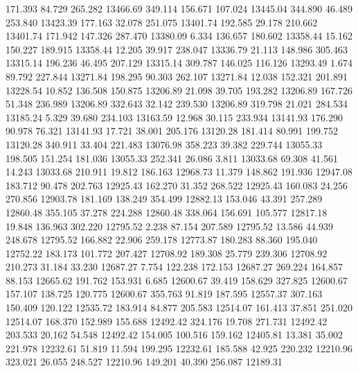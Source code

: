  171.393   84.729  265.282     13466.69
 349.114  156.671  107.024     13445.04
 344.890   46.489  253.840     13423.39
 177.163   32.078  251.075     13401.74
 192.585   29.178  210.662     13401.74
 171.942  147.326  287.470     13380.09
   6.334  136.657  180.602     13358.44
  15.162  150.227  189.915     13358.44
  12.205   39.917  238.047     13336.79
  21.113  148.986  305.463     13315.14
 196.236   46.495  207.129     13315.14
 309.787  146.025  116.126     13293.49
   1.674   89.792  227.844     13271.84
 198.295   90.303  262.107     13271.84
  12.038  152.321  201.891     13228.54
  10.852  136.508  150.875     13206.89
  21.098   39.705  193.282     13206.89
 167.726   51.348  236.989     13206.89
 332.643   32.142  239.530     13206.89
 319.798   21.021  284.534     13185.24
   5.329   39.680  234.103     13163.59
  12.968   30.115  233.934     13141.93
 176.290   90.978   76.321     13141.93
  17.721   38.001  205.176     13120.28
 181.414   80.991  199.752     13120.28
 340.911   33.404  221.483     13076.98
 358.223   39.382  229.744     13055.33
 198.505  151.254  181.036     13055.33
 252.341   26.086    3.811     13033.68
  69.308   41.561   14.243     13033.68
 210.911   19.812  186.163     12968.73
  11.379  148.862  191.936     12947.08
 183.712   90.478  202.763     12925.43
 162.270   31.352  268.522     12925.43
 160.083   24.256  270.856     12903.78
 181.169  138.249  354.499     12882.13
 153.046   43.391  257.289     12860.48
 355.105   37.278  224.288     12860.48
 338.064  156.691  105.577     12817.18
  19.848  136.963  302.220     12795.52
   2.238   87.154  207.589     12795.52
  13.586   44.939  248.678     12795.52
 166.882   22.906  259.178     12773.87
 180.283   88.360  195.040     12752.22
 183.173  101.772  207.427     12708.92
 189.308   25.779  239.306     12708.92
 210.273   31.184   33.230     12687.27
   7.754  122.238  172.153     12687.27
 269.224  164.857   88.153     12665.62
 191.762  153.931    6.685     12600.67
  39.419  158.629  327.825     12600.67
 157.107  138.725  120.775     12600.67
 355.763   91.819  187.595     12557.37
 307.163  150.409  120.122     12535.72
 183.914   84.877  205.583     12514.07
 161.413   37.851  251.020     12514.07
 168.370  152.989  155.688     12492.42
 324.176   19.708  271.731     12492.42
 203.533   20.162   54.548     12492.42
 154.005  100.516  159.162     12405.81
  13.381   35.002  221.978     12232.61
  51.819   11.594  199.295     12232.61
 185.588   42.925  220.232     12210.96
 323.021   26.055  248.527     12210.96
 149.201   40.390  256.087     12189.31
